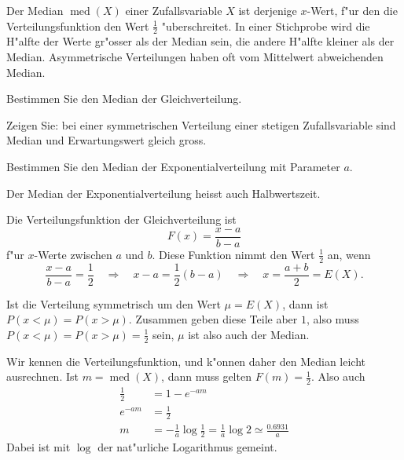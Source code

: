 Der Median $\operatorname{med}(X)$ einer Zufallsvariable $X$
ist derjenige $x$-Wert, f"ur den die
Verteilungsfunktion den Wert $\frac12$ "uberschreitet. In einer
Stichprobe wird die H"alfte der Werte gr"osser als der Median
sein, die andere H"alfte kleiner als der Median. Asymmetrische
Verteilungen haben oft vom Mittelwert abweichenden Median.

\begin{teilaufgaben}
\item Bestimmen Sie den Median der Gleichverteilung.
\item Zeigen Sie: bei einer symmetrischen Verteilung einer
stetigen Zufallsvariable sind Median
und Erwartungswert gleich gross.
\item Bestimmen Sie den Median der Exponentialverteilung mit Parameter $a$.
\end{teilaufgaben}
Der Median der Exponentialverteilung heisst auch Halbwertszeit.

\begin{loesung}
\begin{teilaufgaben}
\item Die Verteilungsfunktion der Gleichverteilung ist
\[
F(x)=\frac{x-a}{b-a}
\]
f"ur $x$-Werte zwischen $a$ und $b$. Diese Funktion nimmt den
Wert $\frac12$ an, wenn
\[
\frac{x-a}{b-a}=\frac12
\quad\Rightarrow\quad
x-a=\frac12(b-a)
\quad\Rightarrow\quad
x=\frac{a+b}2=E(X).
\]
\item Ist die Verteilung symmetrisch um den Wert $\mu=E(X)$, dann
ist $P(x<\mu)=P(x>\mu)$. Zusammen geben diese Teile aber $1$, also
muss $P(x<\mu)=P(x>\mu)=\frac12$ sein, $\mu$ ist also auch der Median.
\item
Wir kennen die Verteilungsfunktion, und k"onnen daher den Median
leicht ausrechnen. Ist $m=\operatorname{med}(X)$, dann muss
gelten $F(m)=\frac12$. Also auch
\begin{align*}
\frac12&=1-e^{-am}\\
e^{-am}&=\frac12\\
m&=-\frac1a\log\frac12=\frac1a\log 2\simeq\frac{0.6931}{a}
\end{align*}
Dabei ist mit $\log$ der nat"urliche Logarithmus gemeint.
\end{teilaufgaben}
\end{loesung}

